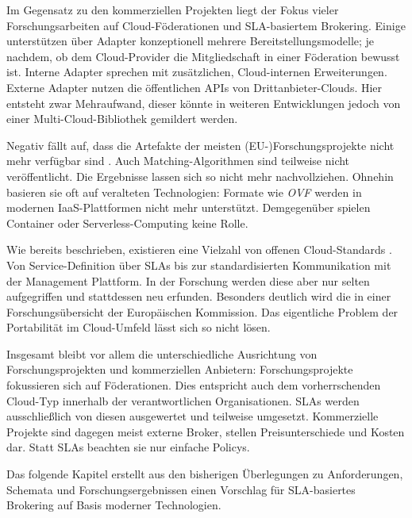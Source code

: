 
\noindent
Im Gegensatz zu den kommerziellen Projekten liegt der Fokus vieler Forschungsarbeiten auf Cloud-Föderationen und SLA-basiertem Brokering. Einige unterstützen über Adapter konzeptionell mehrere Bereitstellungsmodelle; je nachdem, ob dem Cloud-Provider die Mitgliedschaft in einer Föderation bewusst ist. Interne Adapter sprechen mit zusätzlichen, Cloud-internen Erweiterungen. Externe Adapter nutzen die öffentlichen APIs von Drittanbieter-Clouds. Hier entsteht zwar Mehraufwand, dieser könnte in weiteren Entwicklungen jedoch von einer Multi-Cloud-Bibliothek gemildert werden.

Negativ fällt auf, dass die Artefakte der meisten (EU-)Forschungsprojekte
nicht mehr verfügbar sind \cite{blasi:2013:eu-projects-overview}. Auch Matching-Algorithmen sind teilweise nicht veröffentlicht. Die Ergebnisse lassen sich so nicht mehr nachvollziehen. Ohnehin basieren sie oft auf veralteten Technologien: Formate wie \emph{OVF} werden in modernen IaaS-Plattformen nicht mehr unterstützt. Demgegenüber spielen Container oder Serverless-Computing keine Rolle.

Wie bereits beschrieben, existieren eine Vielzahl von offenen Cloud-Standards \cite{bmwi:2012:cloud-standards}. Von Service-Definition über SLAs bis zur standardisierten Kommunikation mit der Management Plattform. In der Forschung werden diese aber nur selten aufgegriffen und stattdessen neu erfunden. Besonders deutlich wird die in einer Forschungsübersicht der Europäischen Kommission.
Das eigentliche Problem der Portabilität im Cloud-Umfeld lässt sich so nicht lösen.

Insgesamt bleibt vor allem die unterschiedliche Ausrichtung von Forschungsprojekten und kommerziellen Anbietern: Forschungsprojekte fokussieren sich auf Föderationen. Dies entspricht auch dem vorherrschenden Cloud-Typ innerhalb der verantwortlichen Organisationen. SLAs werden ausschließlich von diesen ausgewertet und teilweise umgesetzt. Kommerzielle Projekte sind dagegen meist externe Broker, stellen Preisunterschiede und Kosten dar. Statt SLAs beachten sie nur einfache Policys.

Das folgende Kapitel erstellt aus den bisherigen Überlegungen zu Anforderungen, Schemata und Forschungsergebnissen einen Vorschlag für SLA-basiertes Brokering auf Basis moderner Technologien.
